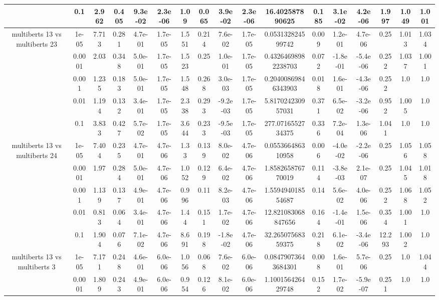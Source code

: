 \begin{tabular}{|c|c|c|c|c|c|c|c|c|c|c|c|c|c|c|c|c|}
 & 0.1 & 2.962 & 0.405 & 9.3e-02 & 2.3e-06 & 1.09 & 0.065 & 3.9e-02 & 2.3e-06 & 16.402587890625 & 0.185 & 3.1e-02 & 4.2e-06 & 1.997 & 1.049 & 1.001 \\
\hline
\multirow{5}{*}{multiberts 13 vs multiberts 23} & 1e-05 & 7.713 & 0.281 & 4.7e-01 & 1.7e-05 & 1.551 & 0.214 & 7.6e-02 & 1.7e-05 & 0.053132824599742 & 0.009 & 1.2e-01 & 4.7e-06 & 0.25 & 1.013 & 1.034 \\
 & 0.0001 & 2.03 & 0.348 & 5.0e-01 & 1.7e-05 & 1.523 & 0.25 & 1.0e-01 & 1.7e-05 & 0.43264698982238703 & 0.072 & -1.8e-01 & -5.4e-06 & 0.252 & 1.037 & 1.001 \\
 & 0.001 & 1.235 & 0.183 & 5.0e-01 & 1.7e-05 & 1.548 & 0.268 & 3.0e-03 & 1.7e-05 & 0.20400869846343903 & 0.018 & 1.6e-01 & -4.3e-06 & 0.252 & 1.0 & 1.0 \\
 & 0.01 & 1.194 & 0.132 & 3.4e-01 & 1.7e-05 & 2.338 & 0.293 & -9.2e-03 & 1.7e-05 & 5.817024230957031 & 0.371 & 6.5e-02 & -3.2e-06 & 0.952 & 1.005 & 1.0 \\
 & 0.1 & 3.833 & 0.427 & 5.7e-02 & 1.7e-05 & 3.644 & 0.233 & -9.5e-03 & 1.7e-05 & 277.0716552734375 & 0.336 & 7.2e-04 & 1.3e-06 & 1.041 & 1.0 & 1.0 \\
\hline
\multirow{5}{*}{multiberts 13 vs multiberts 24} & 1e-05 & 7.404 & 0.235 & 4.7e-01 & 4.7e-06 & 1.33 & 0.139 & 8.0e-02 & 4.7e-06 & 0.055366486310958 & 0.006 & -4.0e-02 & -2.2e-06 & 0.25 & 1.056 & 1.058 \\
 & 0.0001 & 1.97 & 0.284 & 5.0e-01 & 4.7e-06 & 1.052 & 0.129 & 6.4e-02 & 4.7e-06 & 1.858265876770019 & 0.114 & -3.8e-03 & 2.1e-07 & 0.25 & 1.045 & 1.018 \\
 & 0.001 & 1.139 & 0.137 & 4.9e-01 & 4.7e-06 & 0.996 & 0.11 & 8.2e-03 & 4.7e-06 & 1.559494018554687 & 0.14 & 5.6e-02 & 4.0e-06 & 0.252 & 1.068 & 1.052 \\
 & 0.01 & 0.813 & 0.064 & 3.4e-01 & 4.7e-06 & 1.44 & 0.151 & 1.7e-02 & 4.7e-06 & 12.821083068847656 & 0.164 & -1.4e-01 & 1.5e-06 & 0.354 & 1.001 & 1.0 \\
 & 0.1 & 1.904 & 0.076 & 7.1e-02 & 4.7e-06 & 8.691 & 0.198 & -1.8e-02 & 4.7e-06 & 32.26507568359375 & 0.218 & 6.1e-02 & -3.4e-06 & 12.293 & 1.002 & 1.0 \\
\hline
\multirow{5}{*}{multiberts 13 vs multiberts 3} & 1e-05 & 7.171 & 0.248 & 4.6e-01 & 6.0e-06 & 1.056 & 0.068 & 7.6e-02 & 6.0e-06 & 0.08479073643684301 & 0.008 & 1.6e-01 & 5.7e-06 & 0.25 & 1.0 & 1.044 \\
 & 0.0001 & 1.809 & 0.243 & 4.9e-01 & 6.0e-06 & 0.954 & 0.126 & 8.1e-02 & 6.0e-06 & 1.100156426429748 & 0.152 & 1.7e-02 & -5.9e-07 & 0.251 & 1.0 & 1.0 \\

\end{tabular}
